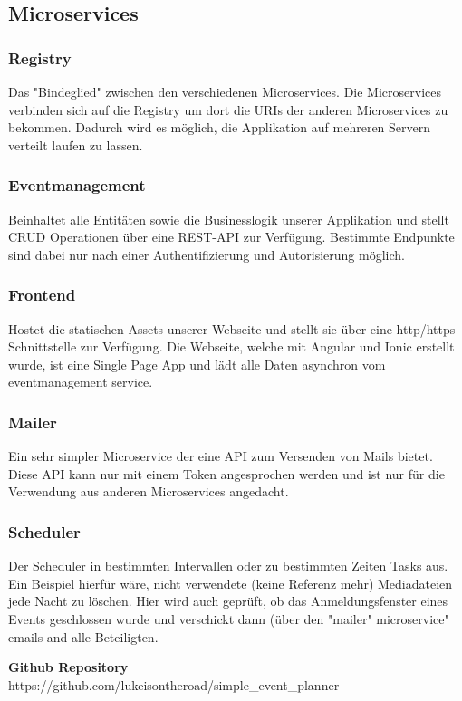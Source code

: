 \documentclass[11pt]{article} %
\begin{document}
\subsection{Microservices}
\subsubsection{Registry}
	Das "Bindeglied" zwischen den verschiedenen Microservices. Die Microservices verbinden sich auf die Registry um dort die URIs der anderen Microservices zu bekommen. Dadurch wird es möglich, die Applikation auf mehreren Servern verteilt laufen zu lassen.

\subsubsection{Eventmanagement}
	Beinhaltet alle Entitäten sowie die Businesslogik unserer Applikation und stellt CRUD Operationen über eine REST-API zur Verfügung. Bestimmte Endpunkte sind dabei nur nach einer Authentifizierung und Autorisierung möglich.

\subsubsection{Frontend}
	Hostet die statischen Assets unserer Webseite und stellt sie über eine http/https Schnittstelle zur Verfügung. Die Webseite, welche mit Angular und Ionic erstellt wurde, ist eine Single Page App und lädt alle Daten asynchron vom eventmanagement service.

\subsubsection{Mailer}
	Ein sehr simpler Microservice der eine API zum Versenden von Mails bietet. Diese API kann nur mit einem Token angesprochen werden und ist nur für die Verwendung aus anderen Microservices angedacht. 

\subsubsection{Scheduler}
	Der Scheduler in bestimmten Intervallen oder zu bestimmten Zeiten Tasks aus. Ein Beispiel hierfür wäre, nicht verwendete (keine Referenz mehr) Mediadateien jede Nacht zu löschen. Hier wird auch geprüft, ob das Anmeldungsfenster eines Events geschlossen wurde und verschickt dann (über den "mailer" microservice" emails and alle Beteiligten.

\newpage

\begin{appendices}

\textbf{Github Repository}\\
https://github.com/lukeisontheroad/simple\_event\_planner\\
\\

\newpage

\end{appendices}
\end{document}
